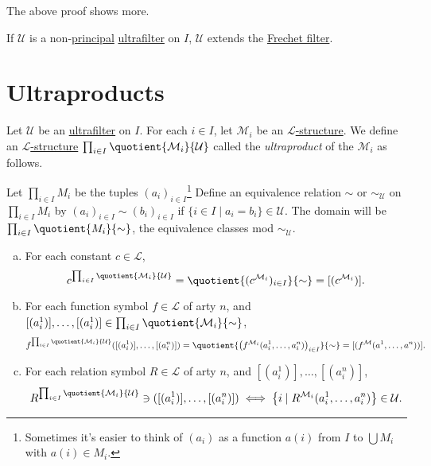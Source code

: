 The above proof shows more.

\begin{remark}
	If \(\mathcal{U} \) is a non-\hyperref[eg:principal-filter]{principal} \hyperref[def:ultrafilter]{ultrafilter} on \(I\), \(\mathcal{U} \) extends the \hyperref[eg:Frechet-filter]{Frechet filter}.
\end{remark}

\section{Ultraproducts}

\begin{definition}[Ultraproduct]\label{def:ultraproduct}
	Let \(\mathcal{U} \) be an \hyperref[def:ultrafilter]{ultrafilter} on \(I\). For each \(i\in I\), let \(\mathcal{M} _i\) be an \hyperref[def:structure]{\(\mathcal{L} \)-structure}. We define an \hyperref[def:structure]{\(\mathcal{L} \)-structure} \(\prod_{i\in I} \quotient{\mathcal{M} _i}{\mathcal{U}} \) called the \emph{ultraproduct} of the \(\mathcal{M} _i\) as follows.

	Let \(\prod_{i\in I} M_i\) be the tuples \((a_i)_{i\in I}\)\footnote{Sometimes it's easier to think of \((a_i)\) as a function \(a(i)\) from \(I\) to \(\bigcup M_i\) with \(a(i)\in M_i\).} Define an equivalence relation \(\sim \) or \(\sim _{\mathcal{U} }\) on \(\prod_{i\in I} M_i\) by \((a_i)_{i\in I} \sim (b_i)_{i\in I}\) if \(\{i\in I \mid a_i = b_i\}\in \mathcal{U} \). The domain will be \(\prod_{i\in I} \quotient{M_i}{\sim } \), the equivalence classes mod \(\sim _\mathcal{U} \).
	\begin{enumerate}[(a)]
		\item For each constant \(c\in \mathcal{L} \),
		      \[
			      c^{\prod_{i\in I} \quotient{\mathcal{M} _i}{\mathcal{U} } } = \quotient{(c^{\mathcal{M} _i})_{i\in I}}{\sim } = [(c^{\mathcal{M} _i})].
		      \]
		\item For each function symbol \(f\in \mathcal{L} \) of arty \(n\), and \([(a_i^1)], \dots , [(a_i^1)] \in \prod_{i\in I} \quotient{\mathcal{M} _i}{\sim } \),
		      \[
			      f^{\prod_{i\in I} \quotient{\mathcal{M} _i}{\mathcal{U} } } ([(a^1_i)], \dots , [(a^n_i)]) = \quotient{\left( f^{\mathcal{M} _i} (a_i^1, \dots , a_i^n) \right) _{i\in I}}{\sim } = [(f^{\mathcal{M} } (a^1, \dots , a^n))].
		      \]
		\item For each relation symbol \(R\in \mathcal{L} \) of arty \(n\), and \([(a_i^1)], \dots , [(a_i^n)]\),
		      \[
			      R^{\prod_{i\in I} \quotient{\mathcal{M} _i}{\mathcal{U} } } \ni ([(a_i^1)], \dots , [(a_i^n)])
			      \iff \left\{ i \mid R^{\mathcal{M} _i} (a_i^1, \dots , a_i^n) \right\} \in \mathcal{U} .
		      \]
	\end{enumerate}
\end{definition}

